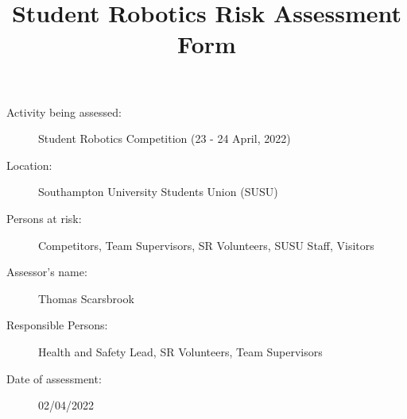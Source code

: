 \documentclass[12pt,a4paper]{scrartcl}
\title{Student Robotics Risk Assessment Form}
\begin{document}
\maketitle

\begin{description}
\item[Activity being assessed:] Student Robotics Competition (23 - 24 April, 2022)
\item[Location:] Southampton University Students Union (SUSU)
\item[Persons at risk:] Competitors, Team Supervisors, SR Volunteers, SUSU Staff, Visitors
\end{description}

\begin{description}
\item[Assessor's name:] Thomas Scarsbrook
\item[Responsible Persons:] Health and Safety Lead, SR Volunteers, Team Supervisors
\item[Date of assessment:] 02/04/2022
\end{description}
\clearpage

\renewcommand{\cellalign}{tl}
\renewcommand{\theadalign}{tl}

\newcommand{\risk}[4]{
	#1 & #2 & #3 & #4 \\
}
\end{document}
